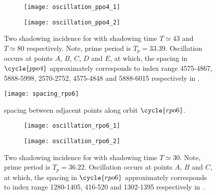 \begin{description}
  \begin{figure}[h]
    \centering
    \begin{subfigure}[b]{0.48\linewidth}
      \centering
      \texttt{[image: oscillation\_ppo4\_1]}
      \caption{}
      \label{fig:oscillation_ppo4_1}
    \end{subfigure}
    \hfill
    \begin{subfigure}[b]{0.48\linewidth}
      \centering
      \texttt{[image: oscillation\_ppo4\_2]}
      \caption{}
      \label{fig:oscillation_ppo4_2}
    \end{subfigure}

    \caption{
      Two shadowing incidence for  with
      shadowing time  $T\simeq 43$ and  $T\simeq 80$ respectively.
      Note, prime period is $T_p = 33.39$.
      Oscillation occurs at points $A$, $B$, $C$, $D$ and $E$, at
      which, the spacing in $\cycle{ppo4}$ approximately corresponds to
      index range 4575-4867, 5888-5998, 2570-2752, 4575-4848 and
      5888-6015 respectively in .
    }
    \label{fig:oscillation_ppo4}
  \end{figure}

  \begin{figure}[h]
    \centering
    \texttt{[image: spacing\_rpo6]}
    \caption{
      spacing between adjacent points along orbit $\cycle{rpo6}$.
    }
    \label{fig:spacing_rpo6}
  \end{figure}

  \begin{figure}[h]
    \centering
    \begin{subfigure}[b]{0.48\linewidth}
      \centering
      \texttt{[image: oscillation\_rpo6\_1]}
      \caption{}
      \label{fig:oscillation_rpo6_1}
    \end{subfigure}
    \hfill
    \begin{subfigure}[b]{0.48\linewidth}
      \centering
      \texttt{[image: oscillation\_rpo6\_2]}
      \caption{}
      \label{fig:oscillation_rpo6_2}
    \end{subfigure}

    \caption{
      Two shadowing incidence for  with
      shadowing time  $T\simeq 30$.
      Note, prime period is $T_p = 36.22$.
      Oscillation occurs at points $A$, $B$ and $C$, at
      which, the spacing in $\cycle{rpo6}$ approximately corresponds to
      index range 1280-1405, 416-520 and 1302-1395
      respectively in .
    }
    \label{fig:oscillation_ppo4}
  \end{figure}


\end{description}
